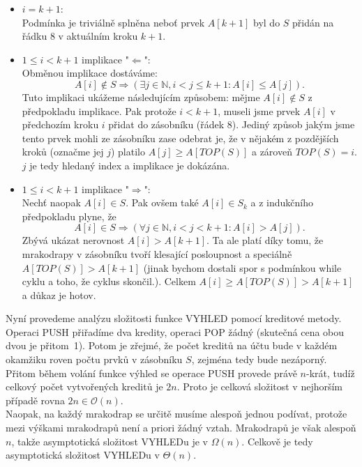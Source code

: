 \documentclass[12pt,a4paper]{article}
\theoremstyle{plain}
\newcommand{\N}{\mathbb{N}}
\begin{document}
\begin{itemize}
\item $i = k + 1$:\\
Podmínka je triviálně splněna neboť prvek $A[k+1]$ byl do $S$ přidán na řádku 8 v aktuálním kroku $k+1$.

\item $1 \leq i < k + 1$ implikace "$ \Leftarrow $":\\
Obměnou implikace dostáváme: 
\begin{equation} \label{alter}
A[i]\not\in S \Rightarrow (\exists j\in\N, i<j\leq k + 1: A[i] \leq A[j]).
\end{equation}
Tuto implikaci ukážeme následujícím způsobem: mějme $ A[i] \not\in S$ z předpokladu implikace. Pak protože $ i < k + 1 $, museli jsme prvek $ A[i] $ v předchozím kroku $ i $ přidat do zásobníku (řádek 8). Jediný způsob jakým jsme tento prvek mohli ze zásobníku zase odebrat je, že v nějakém z pozdějších kroků (označme jej $ j $) platilo $ A[j] \geq A[TOP(S)]$ a zároveň $ TOP(S) = i $. $ j $ je tedy hledaný index a implikace je dokázána.

\item $1 \leq i < k + 1$ implikace "$ \Rightarrow $":\\
Nechť naopak $ A[i] \in S $. Pak ovšem také $ A[i] \in S_k $ a z indukčního předpokladu plyne, že 
\begin{equation}
A[i]\in S \Rightarrow (\forall j\in\N, i < j < k + 1: A[i]>A[j]).
\end{equation}
Zbývá ukázat nerovnost $ A[i] > A[k + 1] $. Ta ale platí díky tomu, že mrakodrapy v zásobníku tvoří klesající posloupnost a speciálně $ A[TOP(S)] > A[k + 1] $ (jinak bychom dostali spor s podmínkou while cyklu a toho, že cyklus skončil.). Celkem $ A[i] \geq A[TOP(S)] > A[k + 1] $ a důkaz je hotov.

\end{itemize}


Nyní provedeme analýzu složitosti funkce VYHLED pomocí kreditové metody. Operaci PUSH přiřadíme dva kredity, operaci POP žádný (skutečná cena obou dvou je přitom~1). Potom je zřejmé, že počet kreditů na účtu bude v každém okamžiku roven počtu prvků v zásobníku $S$, zejména tedy bude nezáporný. Přitom během volání funkce výhled se operace PUSH provede právě $n$-krát, tudíž celkový počet vytvořených kreditů je $2n$. Proto je celková složitost v nejhorším případě rovna $2n\in\mathcal{O}(n)$.\\

Naopak, na každý mrakodrap se určitě musíme alespoň jednou podívat, protože mezi výškami mrakodrapů není a priori žádný vztah. Mrakodrapů je však alespoň $n$, takže asymptotická složitost VYHLEDu je v $\Omega(n)$. Celkově je tedy asymptotická složitost VYHLEDu v $\Theta(n)$.
\end{document}
